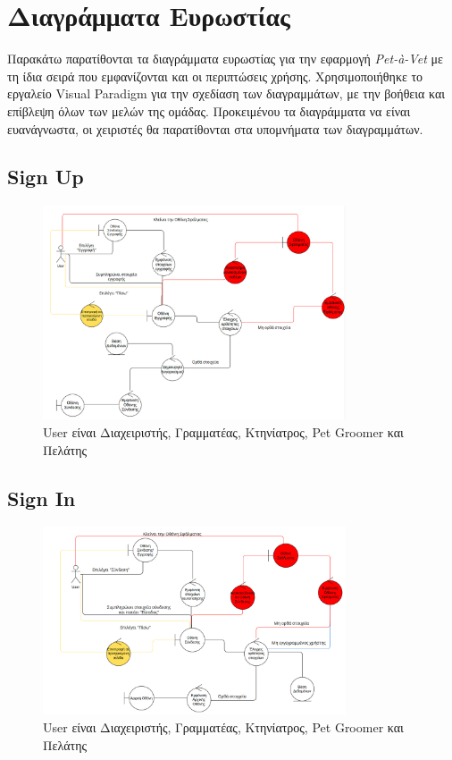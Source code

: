 \documentclass[12pt,a4paper,twoside]{book}
\begin{document}
\section{Διαγράμματα Ευρωστίας}

Παρακάτω παρατίθονται τα διαγράμματα ευρωστίας για την εφαρμογή \textit{Pet-à-Vet} με τη ίδια σειρά που εμφανίζονται και οι περιπτώσεις χρήσης. Χρησιμοποιήθηκε το εργαλείο Visual Paradigm για την σχεδίαση των διαγραμμάτων, με την βοήθεια και επίβλεψη όλων των μελών της ομάδας. Προκειμένου τα διαγράμματα να είναι ευανάγνωστα, οι χειριστές θα παρατίθονται στα υπομνήματα των διαγραμμάτων. %

\subsection{Sign Up}
\begin{figure}[H]
    \centering
    \includegraphics[width=0.8\textwidth]{Resources/Robustness Diagram/SignUp.png}
    \caption{User είναι Διαχειριστής, Γραμματέας, Κτηνίατρος, Pet Groomer και Πελάτης}\label{fig:robustness-signup}
\end{figure}

\subsection{Sign In}
\begin{figure}[H]
    \centering
    \includegraphics[width=0.8\textwidth]{Resources/Robustness Diagram/SignIn.png}
    \caption{User είναι Διαχειριστής, Γραμματέας, Κτηνίατρος, Pet Groomer και Πελάτης}\label{fig:robustness-signin}
\end{figure}
\end{document}
